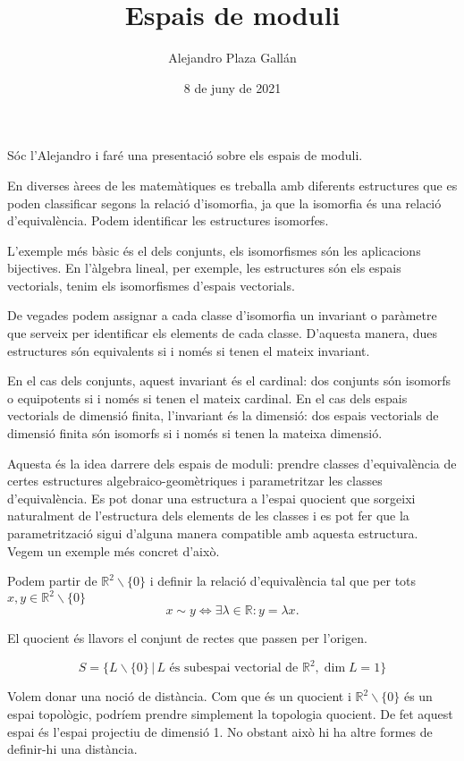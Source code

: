 \documentclass{article}
\title{Espais de moduli}
\author{Alejandro Plaza Gall\'{a}n}
\date{8 de juny de 2021}
\theoremstyle{definition}
\begin{document}
\maketitle

S\'{o}c l'Alejandro i far\'{e} una presentaci\'{o} sobre els espais de moduli.

En diverses \`{a}rees de les matem\`{a}tiques es treballa amb diferents estructures que es poden classificar segons la relaci\'{o} d'isomorfia, ja que la isomorfia \'{e}s una relaci\'{o} d'equival\`{e}ncia. Podem identificar les estructures isomorfes.

L'exemple m\'{e}s b\`{a}sic \'{e}s el dels conjunts, els isomorfismes s\'{o}n les aplicacions bijectives. En l'\`{a}lgebra lineal, per exemple, les estructures s\'{o}n els espais vectorials, tenim els isomorfismes d'espais vectorials.

De vegades podem assignar a cada classe d'isomorfia un invariant o par\`{a}metre que serveix per identificar els elements de cada classe. D'aquesta manera, dues estructures s\'{o}n equivalents si i nom\'{e}s si tenen el mateix invariant.

En el cas dels conjunts, aquest invariant \'{e}s el cardinal: dos conjunts s\'{o}n isomorfs o equipotents si i nom\'{e}s si tenen el mateix cardinal. En el cas dels espais vectorials de dimensi\'{o} finita, l'invariant \'{e}s la dimensi\'{o}: dos espais vectorials de dimensi\'{o} finita s\'{o}n isomorfs si i nom\'{e}s si tenen la mateixa dimensi\'{o}.

Aquesta \'{e}s la idea darrere dels espais de moduli: prendre classes d'equival\`{e}ncia de certes estructures algebraico-geom\`{e}triques i parametritzar les classes d'equival\`{e}ncia. Es pot donar una estructura a l'espai quocient que sorgeixi naturalment de l'estructura dels elements de les classes i es pot fer que la parametritzaci\'{o} sigui d'alguna manera compatible amb aquesta estructura. Vegem un exemple m\'{e}s concret d'aix\`{o}.

Podem partir de $\mathbb{R}^2\backslash\{0\}$ i definir la relaci\'{o} d'equival\`{e}ncia tal que per tots $x,y\in\mathbb{R}^2\backslash\{0\}$
\[x\sim y\Leftrightarrow\exists\lambda\in\mathbb{R}:y=\lambda x.\]

El quocient \'{e}s llavors el conjunt de rectes que passen per l'origen.

\[S=\{L\backslash\{0\}\,|\,L\text{ \'{e}s subespai vectorial de }\mathbb{R}^2,\dim L=1\}\]

Volem donar una noci\'{o} de dist\`{a}ncia. Com que \'{e}s un quocient i $\mathbb{R}^2\backslash\{0\}$ \'{e}s un espai topol\`{o}gic, podr\'{i}em prendre simplement la topologia quocient. De fet aquest espai \'{e}s l'espai projectiu de dimensi\'{o} 1. No obstant aix\`{o} hi ha altre formes de definir-hi una dist\`{a}ncia.
\end{document}
